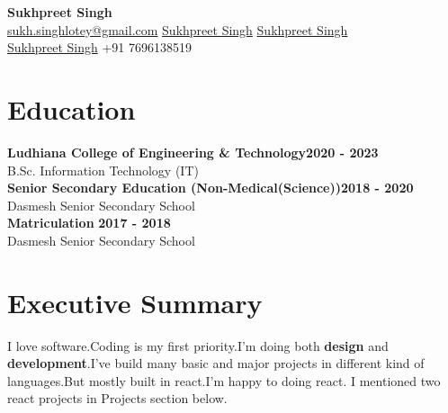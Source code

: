 \documentclass[letterpaper, 11pt]{article}
\newcommand{\iconSpace}{\hspace{1px}}
\newcommand{\hSpace}{\hspace{8px}}
\newcommand{\secStartSpace}{\vspace{3pt}}
\newcommand{\secEndSpace}{\vspace{5pt}}
\newcommand{\spaceCollapse}{\vspace{-5pt}}
\begin{document}
\begin{center} 
	{\Large \textbf{Sukhpreet Singh}}\\
	\vspace{1px}
	{\footnotesize
		 \href{mailto:joesmith@gmail.com}{sukh.singhlotey@gmail.com} 
		\hSpace
		 \iconSpace \href{https://sukhlotey.github.io/website}{Sukhpreet Singh} 
		\hSpace 
		 \hspace{.1px} \href{https://www.linkedin.com/in/sukhpreetlotey/}{Sukhpreet Singh} 
		\hSpace
		}\\
	{\footnotesize
		 \iconSpace \href{https://github.com/sukhlotey}{Sukhpreet Singh}
		\hSpace 
		 \iconSpace
		+91 7696138519
	}
\end{center}
\spaceCollapse


\section{\color{blue} \textbf{Education}}
\secStartSpace

\begin{addmargin}[1em]{1em}
	\textbf{Ludhiana College of Engineering & Technology}\hfill \textbf{2020 - 2023}\\
	\setlength\parindent{1cm} B.Sc. Information Technology (IT)\\
        \textbf{Senior Secondary Education (Non-Medical(Science))}\hfill \textbf{2018 - 2020}\\
        \setlength\parindent{1cm} Dasmesh Senior Secondary School\\
        \textbf{  Matriculation }\hfill \textbf{2017 - 2018}\\
        \setlength\parindent{1cm} Dasmesh Senior Secondary School\\
\end{addmargin}
\secEndSpace


\section{\color{blue} \textbf{Executive Summary}}
\secStartSpace
I love software.Coding is my first priority.I'm doing both \textbf{design} and \textbf{development}.I've build many basic and major projects in different kind of languages.But mostly built in react.I'm happy to doing react.
I mentioned two react projects in Projects section below.
\secEndSpace
\end{document}
